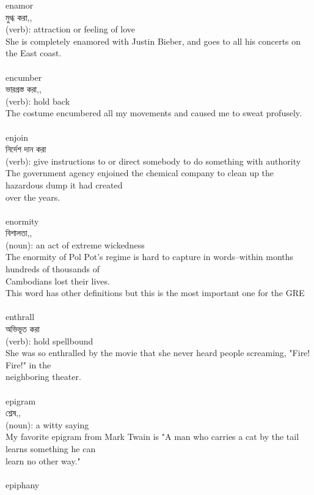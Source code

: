 \documentclass{article}
\begin{document}
{enamor}\\
{মুগ্ধ করা,,}\\
{(verb): attraction or feeling of love\\She is completely enamored with Justin Bieber, and goes to all his concerts on the East coast.\\}\\
{encumber}\\
{ভারগ্রস্ত করা,,}\\
{(verb): hold back\\The costume encumbered all my movements and caused me to sweat profusely.\\}\\
{enjoin}\\
{নির্দেশ দান করা}\\
{(verb): give instructions to or direct somebody to do something with authority\\The government agency enjoined the chemical company to clean up the hazardous dump it had created\\over the years.\\}\\
{enormity}\\
{বিশালতা,,}\\
{(noun): an act of extreme wickedness\\The enormity of Pol Pot's regime is hard to capture in words--within months hundreds of thousands of\\Cambodians lost their lives.\\This word has other definitions but this is the most important one for the GRE\\}\\
{enthrall}\\
{অভিভূত করা}\\
{(verb): hold spellbound\\She was so enthralled by the movie that she never heard people screaming, "Fire! Fire!" in the\\neighboring theater.\\}\\
{epigram}\\
{শ্লেষ,,}\\
{(noun): a witty saying\\My favorite epigram from Mark Twain is "A man who carries a cat by the tail learns something he can\\learn no other way."\\}\\
{epiphany}\\
\end{document}
